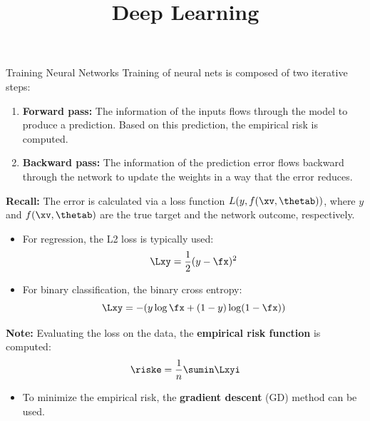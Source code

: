




\newcommand{\titlefigure}{figure_man/SGD.png}
\newcommand{\learninggoals}{
  \item Gradient Descent
  \item Stochastic Gradient Descent
  \item Minibatch Gradient Descent
  \item Learning Rates and (S)GD specifics
}

\title{Deep Learning}
\date{}




\begin{vbframe}{Training Neural Networks}
\lz
Training of neural nets is composed of two iterative steps:
\lz
\begin{enumerate}
\item \textbf{Forward pass:} The information of the inputs flows through the model to produce a prediction. Based on this prediction, the empirical risk is computed.
\lz
\item \textbf{Backward pass:} The information of the prediction error flows backward through the network to update the weights in a way that the error reduces.
\end{enumerate}
\lz

\textbf{Recall:} The error is calculated via a loss function $L(y, f(\xv, \thetab))$, where $y$ and $f(\xv, \thetab)$ are the true target and the network outcome, respectively.
\framebreak

\lz
\lz
\begin{itemize}
\item For regression, the L2 loss is typically used:
$$\Lxy = \frac{1}{2}(y - \fx)^2$$
\item For binary classification, the binary cross entropy:
$$\Lxy = - (y \log \fx + (1 - y) \log(1 - \fx))$$
\end{itemize}
\lz
\textbf{Note:} Evaluating the loss on the data, the \textbf{empirical risk function} is computed:
$$\riske = \frac{1}{n} \sumin \Lxyi$$
\begin{itemize}
 \item To minimize the empirical risk, the \textbf{gradient descent} (GD) method can be used.
\end{itemize}
\end{vbframe}

